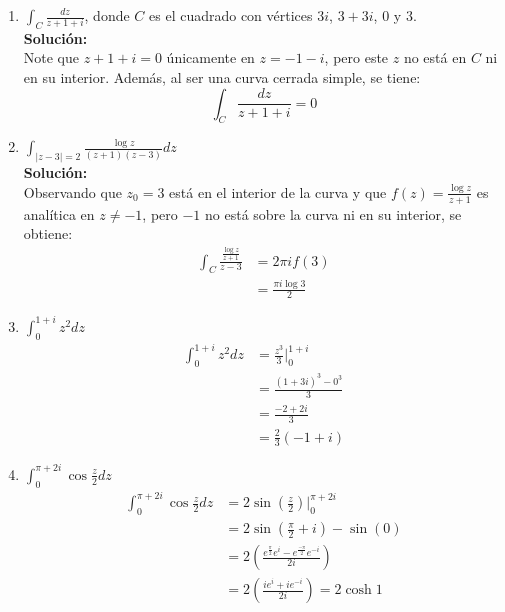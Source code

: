 \begin{enumerate}
		\item $\int_{C}\frac{dz}{z+1+i}$, donde $C$ es el cuadrado con vértices $3i$, $3+3i$, $0$ y $3$.
		\\ \textbf{Solución:} \\
		Note que $z+1+i=0$ únicamente en $z=-1-i$, pero este $z$ no está en $C$ ni en su interior. Además, al ser una curva cerrada simple, se tiene: 
		$$\int_{C} \frac{dz}{z+1+i}=0$$
		\item $\int_{\lvert z-3\rvert=2} \frac{\log{z}}{(z+1)(z-3)}dz$
		\\ \textbf{Solución:} \\
		Observando que $z_0=3$ está en el interior de la curva y que $f(z)=\frac{\log{z}}{z+1}$ es analítica en $z\neq-1$, pero $-1$ no está sobre la curva ni en su interior, se obtiene:
		\begin{align*}
			\int_{C} \frac{\frac{\log{z}}{z+1}}{z-3} &= 2\pi i f(3) \\
			&= \frac{\pi i \log{3}}{2}
		\end{align*}
		\item $\int_{0}^{1+i}z^{2}dz$
		\begin{align*}
			\int_{0}^{1+i}z^{2}dz &= \frac{z^{3}}{3}\bigg|_{0}^{1+i}\\
			&= \frac{(1+3i)^{3}-0^{3}}{3} \\
			&= \frac{-2+2i}{3} \\
			&= \frac{2}{3}(-1+i)
		\end{align*}
		\item $\int_{0}^{\pi+2i}\cos{\frac{z}{2}}dz$
		\begin{align*}
			\int_{0}^{\pi+2i}\cos{\frac{z}{2}}dz &= 2 \sin\left(\frac{z}{2}\right)\bigg|_{0}^{\pi +2i}\\
			&= 2 \sin\left(\frac{\pi}{2}+i\right)-\sin(0) \\
			&= 2\left(\frac{e^{\frac{\pi}{2}} e^{i} -  e^{\frac{-\pi}{2}} e^{-i} }{2i}\right) \\
			&= 2\left(\frac{ie^{i}+ie^{-i}}{2i}\right) = 2 \cosh{1}
		\end{align*}
	\end{enumerate}
